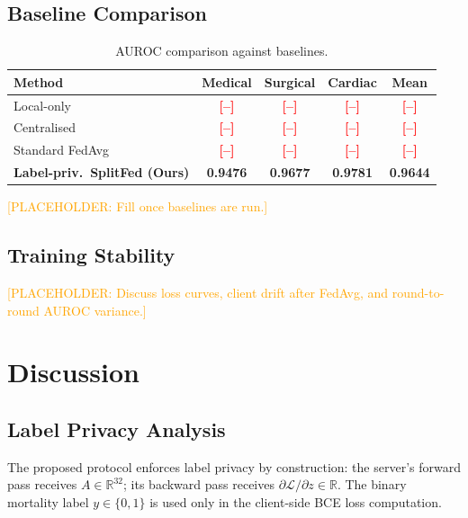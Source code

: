 \documentclass[10pt,twocolumn]{article}
\newcommand{\todo}[1]{\textcolor{red}{\textbf{[#1]}}}
\newcommand{\placeholder}[1]{\textcolor{orange}{[PLACEHOLDER: #1]}}
\begin{document}
\subsection{Baseline Comparison}

\begin{table}[h]
\centering
\caption{AUROC comparison against baselines.}
\label{tab:comparison}
\begin{tabular}{lcccc}
\toprule
Method & Medical & Surgical & Cardiac & Mean \\
\midrule
Local-only                          & \todo{--} & \todo{--} & \todo{--} & \todo{--} \\
Centralised                         & \todo{--} & \todo{--} & \todo{--} & \todo{--} \\
Standard FedAvg                     & \todo{--} & \todo{--} & \todo{--} & \todo{--} \\
\textbf{Label-priv.\ SplitFed (Ours)} & \textbf{0.9476} & \textbf{0.9677} & \textbf{0.9781} & \textbf{0.9644} \\
\bottomrule
\end{tabular}
\end{table}

\placeholder{Fill once baselines are run.}

\subsection{Training Stability}

\placeholder{Discuss loss curves, client drift after FedAvg, and
round-to-round AUROC variance.}

\section{Discussion}
\label{sec:discussion}

\subsection{Label Privacy Analysis}

The proposed protocol enforces label privacy by construction: the
server's forward pass receives $A\in\mathbb{R}^{32}$; its backward
pass receives $\partial\mathcal{L}/\partial z\in\mathbb{R}$.  The
binary mortality label $y\in\{0,1\}$ is used only in the client-side
BCE loss computation.
\end{document}
